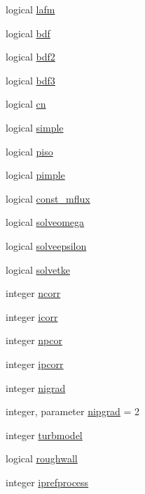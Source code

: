 \begin{DoxyCompactItemize}
\item 
logical \hyperlink{classparameters_ad19a7858d6ee32ee981bbcf0f1c15277}{lafm}
\item 
logical \hyperlink{classparameters_a3eb9bfb234c72de12ef64cdf189eb334}{bdf}
\item 
logical \hyperlink{classparameters_a7b4b5b884b0646fdebae149c324efee0}{bdf2}
\item 
logical \hyperlink{classparameters_aa8493f6c1a3991dc5c6fe99cd83da8a0}{bdf3}
\item 
logical \hyperlink{classparameters_aba97e1d2ea3cabe48d1d4a4d23f45cbd}{cn}
\item 
logical \hyperlink{classparameters_ac3884668f4f779949ded0df3b287ff1e}{simple}
\item 
logical \hyperlink{classparameters_a6e3814526eb5d4688e786b776e333c68}{piso}
\item 
logical \hyperlink{classparameters_a06a69513ef60e051130cbe69d2f71e09}{pimple}
\item 
logical \hyperlink{classparameters_ae155d0348d784d1ce8b494e2cc214200}{const\-\_\-mflux}
\item 
logical \hyperlink{classparameters_a2e4f568629e8ab4725b082b457ea5e7a}{solveomega}
\item 
logical \hyperlink{classparameters_ad3189fd9cd3944a959b2b64836e68ddf}{solveepsilon}
\item 
logical \hyperlink{classparameters_ae7747c8e1e1b415e8407c63af7c2f7e2}{solvetke}
\item 
integer \hyperlink{classparameters_a29b4860883a45d946a351cf857d64777}{ncorr}
\item 
integer \hyperlink{classparameters_ad9c135806011c8d812a818c336ca71ef}{icorr}
\item 
integer \hyperlink{classparameters_a7e9a19a3f51eed5371a914ba6dfe80ac}{npcor}
\item 
integer \hyperlink{classparameters_ab383635f5e71e0ac5c99b1315172364a}{ipcorr}
\item 
integer \hyperlink{classparameters_aa91db57a797a6ddebc34cd969fe8c762}{nigrad}
\item 
integer, parameter \hyperlink{classparameters_a65960673b4dcafc001e47eb1a31eac13}{nipgrad} = 2
\item 
integer \hyperlink{classparameters_af51c886efc5599880eb47db610a872fb}{turbmodel}
\item 
logical \hyperlink{classparameters_a9635e00c308c351a86a27e749d8de6a4}{roughwall}
\item 
integer \hyperlink{classparameters_aa0436ce409ef8870aa4a238df3741db4}{iprefprocess}

\end{DoxyCompactItemize}
